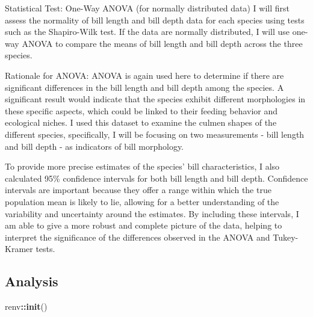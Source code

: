 \documentclass[
]{article}
\newenvironment{Shaded}{\begin{snugshade}}{\end{snugshade}}
\newcommand{\FunctionTok}[1]{\textcolor[rgb]{0.13,0.29,0.53}{\textbf{#1}}}
\newcommand{\NormalTok}[1]{#1}
\newcommand{\SpecialCharTok}[1]{\textcolor[rgb]{0.81,0.36,0.00}{\textbf{#1}}}
\begin{document}
Statistical Test: One-Way ANOVA (for normally distributed data) I will
first assess the normality of bill length and bill depth data for each
species using tests such as the Shapiro-Wilk test. If the data are
normally distributed, I will use one-way ANOVA to compare the means of
bill length and bill depth across the three species.

Rationale for ANOVA: ANOVA is again used here to determine if there are
significant differences in the bill length and bill depth among the
species. A significant result would indicate that the species exhibit
different morphologies in these specific aspects, which could be linked
to their feeding behavior and ecological niches. I used this dataset to
examine the culmen shapes of the different species, specifically, I will
be focusing on two measurements - bill length and bill depth - as
indicators of bill morphology.

To provide more precise estimates of the species' bill characteristics,
I also calculated 95\% confidence intervals for both bill length and
bill depth. Confidence intervals are important because they offer a
range within which the true population mean is likely to lie, allowing
for a better understanding of the variability and uncertainty around the
estimates. By including these intervals, I am able to give a more robust
and complete picture of the data, helping to interpret the significance
of the differences observed in the ANOVA and Tukey-Kramer tests.

\subsection{Analysis}\label{analysis}

\begin{Shaded}
\begin{Highlighting}[]
\NormalTok{renv}\SpecialCharTok{::}\FunctionTok{init}\NormalTok{()}
\end{Highlighting}
\end{Shaded}
\end{document}
